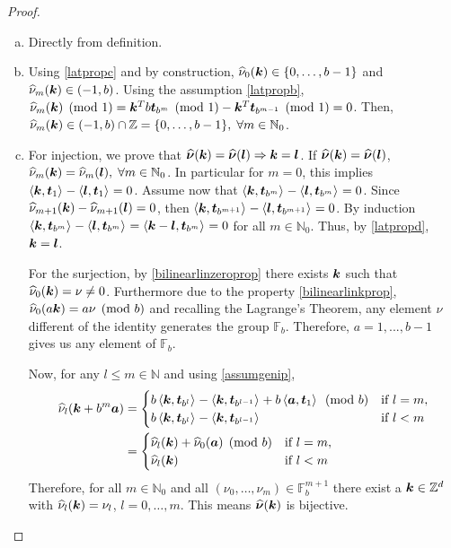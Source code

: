 \documentclass[graybox,footinfo]{svmult}
\newcommand{\Z}{\mathbb{Z}} %
\newcommand{\N}{\mathbb{N}} %
\newcommand{\F}{\mathbb{F}} %
\newcommand{\bst}{\boldsymbol{t}}    %
\begin{document}
\begin{proof}
\begin{enumerate}[a)]
\item Directly from definition.
\item Using \eqref{latpropc} and by construction, $\widehat{\nu}_0(\boldsymbol{k})\in\{0,\dots,b-1\}$ and $\widehat{\nu}_m(\boldsymbol{k})\in (-1,b)$. Using the assumption \eqref{latpropb}, $\hnu_m(\bsk)\pmod 1=\bsk^Tb\bst_{b^m}\pmod 1-\bsk^T\bst_{b^{m-1}}\pmod 1=0$. Then, $\hnu_m(\bsk)\in (-1,b)\cap\Z=\{0,\dots,b-1\},\;\forall m\in\N_0$.

\item For injection, we prove that $\widehat{\boldsymbol{\nu}}(\boldsymbol{k})=\widehat{\boldsymbol{\nu}}(\boldsymbol{l}) \Rightarrow \boldsymbol{k} = \boldsymbol{l}$. If $\widehat{\boldsymbol{\nu}}(\boldsymbol{k})=\widehat{\boldsymbol{\nu}}(\boldsymbol{l})$, $\hnu_m(\bsk)=\hnu_m(\bsl),\;\forall m\in\N_0$. In particular for $m=0$, this implies $\ip{\bsk}{\bst_1}-\ip{\bsl}{\bst_1}=0$. Assume now that $\ip{\bsk}{\bst_{b^m}}-\ip{\bsl}{\bst_{b^m}}=0$. Since $\widehat{\nu}_{m+1}(\boldsymbol{k})-\widehat{\nu}_{m+1}(\boldsymbol{l})=0$, then $\ip{\bsk}{\bst_{b^{m+1}}}-\ip{\bsl}{\bst_{b^{m+1}}}=0$. By induction $\ip{\bsk}{\bst_{b^{m}}}-\ip{\bsl}{\bst_{b^{m}}}=\ip{\bsk-\bsl}{\bst_{b^{m}}}=0$ for all $m\in\N_0$. Thus, by \eqref{latpropd}, $\boldsymbol{k}=\boldsymbol{l}$.

\vspace{2mm}
    For the surjection, by \eqref{bilinearlinzeroprop} there exists $\boldsymbol{k}$ such that $\widehat{\nu}_0(\boldsymbol{k})=\nu\neq 0$. Furthermore due to the property \eqref{bilinearlinkprop}, $\widehat{\nu}_0(a\boldsymbol{k})=a\nu \pmod b$ and recalling the Lagrange's Theorem, any element $\nu$ different of the identity generates the group $\F_b$. Therefore, $a=1,...,b-1$ gives us any element of $\F_b$.

    Now, for any $l\leq m\in\N$ and using \eqref{assumgenip},
\begin{align*}
\hnu_l(\bsk+b^m\bsa)&=
\begin{cases}
b\ip{\bsk}{\bst_{b^l}}-\ip{\bsk}{\bst_{b^{l-1}}}+b\ip{\bsa}{\bst_{1}} \pmod b  &\mbox{if } l=m, \\
b\ip{\bsk}{\bst_{b^l}}-\ip{\bsk}{\bst_{b^{l-1}}} &\mbox{if } l<m   \end{cases}\\
&=
\begin{cases}
\hnu_l(\bsk)+\hnu_0(\bsa) \pmod b  &\mbox{if } l=m, \\
\hnu_l(\bsk) &\mbox{if } l<m   \end{cases}\\
\end{align*}
Therefore, for all $m\in \N_0$ and all $(\nu_0,\dots,\nu_m) \in \F_b^{m+1}$ there exist a $\bsk \in \Z^d$ with $\widehat{\nu}_l(\boldsymbol{k})=\nu_l$, $l=0,\dots,m$. This means $\widehat{\boldsymbol{\nu}}(\boldsymbol{k})$ is bijective.


\end{enumerate}
\end{proof}
\end{document}
